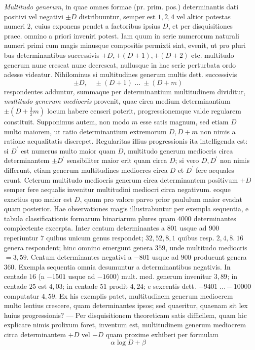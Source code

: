 \textit{Multitudo generum}, in quae omnes formae (pr. prim. pos.) determinantis dati positivi vel negativi \(\pm D\) distribuuntur, semper est \(1,2,4\) vel altior potestas numeri \(2\), cuius exponens pendet a factoribus ipsius \(D\), et per disquisitiones praec. omnino a priori inveniri potest. Iam quum in serie numerorum naturali numeri primi cum magis minusque compositis permixti sint, evenit, ut pro pluri%
bus determinantibus successivis \(\pm D,\pm(D+1),\pm(D+2)\) etc. multitudo generum nunc crescat nunc decrescat, nullusque in hac serie perturbata ordo adesse videatur. Nihilominus si multitudines generum multis dett. successivis 
\[\pm D,\quad\pm(D+1)\;\ldots\;\pm(D+m)\]
 respondentes adduntur, summaque per determinantium multitudinem dividitur, \textit{multitudo generum mediocris} provenit, quae circa medium determinantium \(\pm(D+\frac12m)\) locum habere censeri poterit, progressionemque valde regularem constituit. Supponimus autem, non modo \(m\) esse satis magnum, sed etiam \(D\) multo maiorem, ut ratio determinantium extremorum \(D,D+m\) non nimis a ratione aequalitatis discrepet. Regularitas illius progressionis ita intelligenda est: si \(D^\prime\) est numerus multo maior quam \(D\), multitudo generum mediocris circa determinantem \(\pm D^\prime\) sensibiliter maior erit quam circa \(D\); si vero \(D,D^\prime\) non nimis differunt, etiam generum multitudines mediocres circa \(D\) et \(D^\prime\) fere aequales erunt. Ceterum multitudo mediocris generum circa determinantem positivum \(+D\) semper fere aequalis invenitur multitudini mediocri circa negativum. eoque exactius quo maior est \(D\), quum pro valore parvo prior paululum maior evadat quam posterior. Hae observationes magis illustrabuntur per exempla sequentia, e tabula classificationis formarum binariarum plures quam \(4000\) determinantes complectente excerpta. Inter centum determinantes a \(801\) usque ad \(900\) reperiuntur \(7\) quibus unicum genus respondet; \(32,52,8,1\) quibus resp. \(2,4,8.\ 16\) genera respondent; hinc omnino emergunt genera \(359\), unde multitudo mediocris \(=3{,}59\). Centum determinantes negativi a \(-801\) usque ad \(900\) producunt genera \(360\). Exempla sequentia omnia desumuntur a determinantibus negativis. In centade \(16\) (a \(-1501\) usque ad \(-1600\)) mult. med. generum invenitur \(3{,}89\); in centade \(25\) est \(4{,}03\); in centade \(51\) prodit \(4{,}24\); e sexcentis dett. \(-9401\;\ldots -10000\) computatur \(4{,}59\). Ex his exemplis patet, multitudinem generum mediocrem multo lentius crescere, quam determinantes ipsos; sed quaeritur, quaenam sit lex huius progressionis? — Per disquisitionem theoreticam satis difficilem, quam hic explicare nimis prolixum foret, inventum est, multitudinem generum mediocrem circa determinantem \(+D\) vel \(-D\) quam proxime exhiberi per formulam 
\[\alpha\log D+\beta\]

